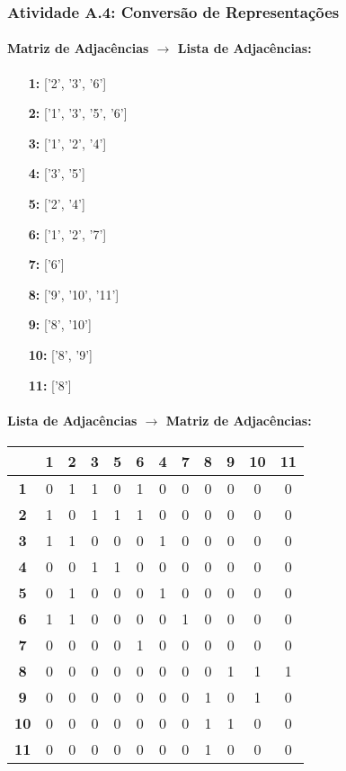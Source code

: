 \documentclass[a4paper,12pt]{article}
\begin{document}
\subsubsection*{Atividade A.4: Conversão de Representações}
\paragraph*{Matriz de Adjacências $\rightarrow$ Lista de Adjacências:}
\begin{itemize}[leftmargin=*]
    \item[\textbf{1:}] ['2', '3', '6'] \item[\textbf{2:}] ['1', '3', '5', '6'] \item[\textbf{3:}] ['1', '2', '4'] \item[\textbf{4:}] ['3', '5']
    \item[\textbf{5:}] ['2', '4'] \item[\textbf{6:}] ['1', '2', '7'] \item[\textbf{7:}] ['6'] \item[\textbf{8:}] ['9', '10', '11']
    \item[\textbf{9:}] ['8', '10'] \item[\textbf{10:}] ['8', '9'] \item[\textbf{11:}] ['8']
\end{itemize}
\paragraph*{Lista de Adjacências $\rightarrow$ Matriz de Adjacências:}
\begin{center}
\scriptsize
\begin{tabular*}{\textwidth}{c|@{\extracolsep{\fill}}ccccccccccc}
\rowcolor[gray]{0.9}
 & \textbf{1} & \textbf{2} & \textbf{3} & \textbf{5} & \textbf{6} & \textbf{4} & \textbf{7} & \textbf{8} & \textbf{9} & \textbf{10} & \textbf{11} \\ \hline
\textbf{1} & 0 & 1 & 1 & 0 & 1 & 0 & 0 & 0 & 0 & 0 & 0 \\ \textbf{2} & 1 & 0 & 1 & 1 & 1 & 0 & 0 & 0 & 0 & 0 & 0 \\
\textbf{3} & 1 & 1 & 0 & 0 & 0 & 1 & 0 & 0 & 0 & 0 & 0 \\ \textbf{4} & 0 & 0 & 1 & 1 & 0 & 0 & 0 & 0 & 0 & 0 & 0 \\
\textbf{5} & 0 & 1 & 0 & 0 & 0 & 1 & 0 & 0 & 0 & 0 & 0 \\ \textbf{6} & 1 & 1 & 0 & 0 & 0 & 0 & 1 & 0 & 0 & 0 & 0 \\
\textbf{7} & 0 & 0 & 0 & 0 & 1 & 0 & 0 & 0 & 0 & 0 & 0 \\ \textbf{8} & 0 & 0 & 0 & 0 & 0 & 0 & 0 & 0 & 1 & 1 & 1 \\
\textbf{9} & 0 & 0 & 0 & 0 & 0 & 0 & 0 & 1 & 0 & 1 & 0 \\ \textbf{10} & 0 & 0 & 0 & 0 & 0 & 0 & 0 & 1 & 1 & 0 & 0 \\
\textbf{11} & 0 & 0 & 0 & 0 & 0 & 0 & 0 & 1 & 0 & 0 & 0 \\
\end{tabular*}
\end{center}
\end{document}
